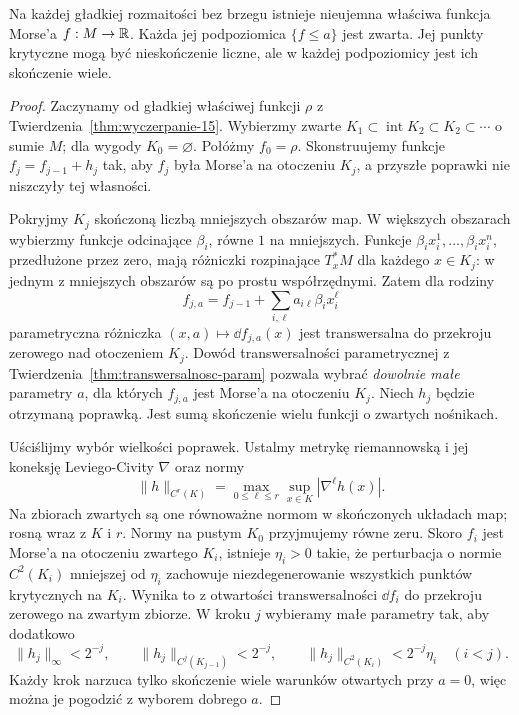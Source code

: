 \begin{twierdzenie}
\label{thm:wlasciwa-morse-15}
Na każdej gładkiej rozmaitości bez brzegu
istnieje nieujemna właściwa funkcja Morse'a $f:M\to\mathbb{R}$.
Każda jej podpoziomica $\{f\leq a\}$ jest zwarta.
Jej punkty krytyczne mogą być nieskończenie liczne,
ale w każdej podpoziomicy jest ich skończenie wiele.
\end{twierdzenie}
\begin{proof}
Zaczynamy od gładkiej właściwej
funkcji $\rho$ z
Twierdzenia~\ref{thm:wyczerpanie-15}.
Wybierzmy zwarte
$K_1\subset\operatorname{int}K_2
\subset K_2\subset\cdots$
o sumie $M$; dla wygody
$K_0=\varnothing$. Połóżmy $f_0=\rho$.
Skonstruujemy funkcje
$f_j=f_{j-1}+h_j$ tak, aby $f_j$
była Morse'a na otoczeniu $K_j$,
a przyszłe poprawki nie niszczyły
tej własności.

Pokryjmy $K_j$ skończoną liczbą
mniejszych obszarów map. W większych
obszarach wybierzmy funkcje
odcinające $\beta_i$, równe $1$
na mniejszych. Funkcje
$\beta_i x_i^1,\ldots,\beta_i x_i^n$,
przedłużone przez zero, mają
różniczki rozpinające $T_x^*M$
dla każdego $x\in K_j$:
w jednym z mniejszych obszarów
są po prostu współrzędnymi.
Zatem dla rodziny
\[
 f_{j,a}=f_{j-1}
       +\sum_{i,\ell}a_{i\ell}\beta_i x_i^\ell
\]
parametryczna różniczka
$(x,a)\mapsto\dd f_{j,a}(x)$
jest transwersalna do przekroju
zerowego nad otoczeniem $K_j$.
Dowód transwersalności
parametrycznej z
Twierdzenia~\ref{thm:transwersalnosc-param}
pozwala wybrać \emph{dowolnie
małe} parametry $a$, dla których
$f_{j,a}$ jest Morse'a na
otoczeniu $K_j$. Niech $h_j$
będzie otrzymaną poprawką.
Jest sumą skończenie wielu
funkcji o zwartych nośnikach.

Uściślijmy wybór wielkości poprawek. Ustalmy
metrykę riemannowską i jej koneksję Leviego-Civity $\nabla$ oraz normy
\[
 \|h\|_{C^r(K)}=\max_{0\leq\ell\leq r}
       \sup_{x\in K}|\nabla^\ell h(x)|.
\]
Na zbiorach zwartych są one równoważne normom
w skończonych układach map; rosną wraz z $K$ i $r$.
Normy na pustym $K_0$ przyjmujemy równe zeru.
Skoro $f_i$ jest Morse'a na
otoczeniu zwartego $K_i$,
istnieje $\eta_i>0$ takie,
że perturbacja o normie
$C^2(K_i)$ mniejszej od
$\eta_i$ zachowuje
niezdegenerowanie wszystkich
punktów krytycznych na $K_i$.
Wynika to z otwartości
transwersalności $\dd f_i$
do przekroju zerowego
na zwartym zbiorze.
W kroku $j$ wybieramy małe
parametry tak, aby dodatkowo
\[
 \|h_j\|_\infty<2^{-j},\qquad
 \|h_j\|_{C^j(K_{j-1})}<2^{-j},\qquad
 \|h_j\|_{C^2(K_i)}
          <2^{-j}\eta_i\quad(i<j).
\]
Każdy krok narzuca tylko
skończenie wiele warunków
otwartych przy $a=0$,
więc można je pogodzić
z wyborem dobrego $a$.


\end{proof}
